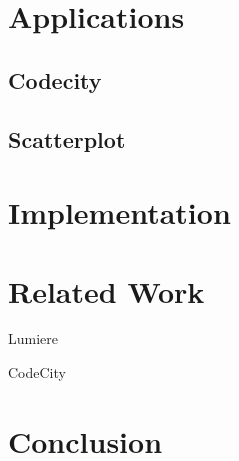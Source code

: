 \documentclass[runningheads]{llncs}
\newcommand{\seclabel}[1]{\label{sec:#1}}
\begin{document}
\section{Applications} \seclabel{applications}

\subsection{Codecity}

\subsection{Scatterplot}


\section{Implementation} \seclabel{implementation}

\section{Related Work} \seclabel{relatedwork}

Lumiere~\cite{Oliv09a}

CodeCity~\cite{Wett08d}

\section{Conclusion} \seclabel{conclusion}



%



\end{document}
